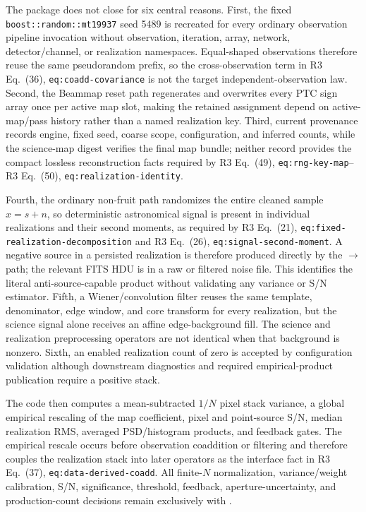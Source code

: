 \documentclass[10pt]{article}
\newcommand{\rthree}[2]{R3 Eq.~(#1), \texttt{#2}}
\begin{document}
The package does not close for six central reasons.  First, the fixed
\texttt{boost::random::mt19937} seed 5489 is recreated for every ordinary
observation pipeline invocation without observation, iteration, array,
network, detector/channel, or realization namespaces.  Equal-shaped
observations therefore reuse the same pseudorandom prefix, so the
cross-observation term in \rthree{36}{eq:coadd-covariance} is not the target
independent-observation law.  Second, the Beammap reset path regenerates and
overwrites every PTC sign array once per active map slot, making the retained
assignment depend on active-map/pass history rather than a named realization
key.  Third, current provenance records engine, fixed seed, coarse scope,
configuration, and inferred counts, while the science-map digest verifies
the final map bundle; neither record provides the compact lossless
reconstruction facts required by \rthree{49}{eq:rng-key-map}--
\rthree{50}{eq:realization-identity}.

Fourth, the ordinary non-fruit path randomizes the entire cleaned sample
$x=s+n$, so deterministic astronomical signal is present in individual
realizations and their second moments, as required by
\rthree{21}{eq:fixed-realization-decomposition} and
\rthree{26}{eq:signal-second-moment}.  A negative source in a persisted
realization is therefore produced directly by the
 $\rightarrow$
 path; the relevant FITS HDU is
 in a raw or filtered noise file.
This identifies the literal anti-source-capable product without validating
any variance or S/N estimator.  Fifth, a Wiener/convolution filter reuses the
same template, denominator, edge window, and core transform for every
realization, but the science signal alone receives an affine edge-background
fill.  The science and realization preprocessing operators are not identical
when that background is nonzero.  Sixth, an enabled realization count of zero
is accepted by configuration validation although downstream diagnostics and
required empirical-product publication require a positive stack.

The code then computes a mean-subtracted $1/N$ pixel stack variance, a global
empirical rescaling of the map coefficient, pixel and point-source S/N,
median realization RMS, averaged PSD/histogram products, and feedback gates.
The empirical rescale occurs before observation coaddition or filtering and
therefore couples the realization stack into later operators as the interface
fact in \rthree{37}{eq:data-derived-coadd}.  All finite-$N$ normalization,
variance/weight calibration, S/N, significance, threshold, feedback,
aperture-uncertainty, and production-count decisions remain exclusively with
.
\end{document}
